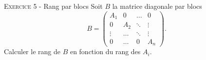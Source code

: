 \documentclass[11pt]{article}
\begin{document}


\vskip0.3cm\noindent\textsc{Exercice 5} - Rang par blocs
\vskip0.2cm
Soit $B$ la matrice diagonale par blocs 
$$B=\left(
\begin{array}{cccc}
A_1&0&\dots&0\\
0&A_2&\ddots&\vdots\\
\vdots&\dots&\ddots&\vdots\\
0&\dots&0&A_n
\end{array}
\right).$$
Calculer le rang de $B$ en fonction du rang des $A_i$.





\vskip0.5cm

\end{document}
